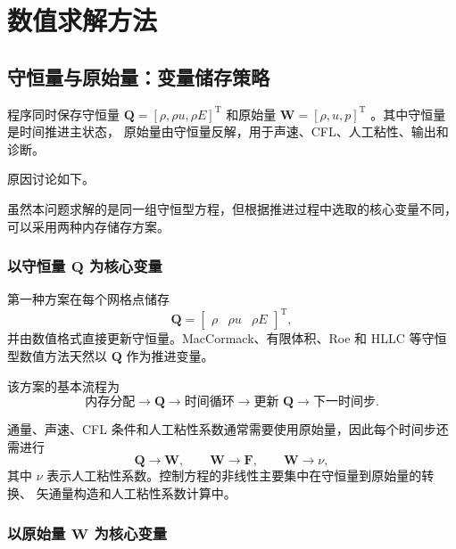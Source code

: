\section{数值求解方法}

\subsection{守恒量与原始量：变量储存策略}

程序同时保存守恒量
$\bm{Q}=[\rho,\rho u,\rho E]^{\mathrm T}$ 和原始量
$\bm{W}=[\rho,u,p]^{\mathrm T}$ 。其中守恒量是时间推进主状态，
原始量由守恒量反解，用于声速、CFL、人工粘性、输出和诊断。

原因讨论如下。

虽然本问题求解的是同一组守恒型方程，但根据推进过程中选取的核心变量不同，
可以采用两种内存储存方案。

\subsubsection{以守恒量 \texorpdfstring{$\bm{Q}$}{Q} 为核心变量}

第一种方案在每个网格点储存
\begin{equation}
\bm{Q}=
\begin{bmatrix}
\rho & \rho u & \rho E
\end{bmatrix}^{\mathrm T},
\end{equation}
并由数值格式直接更新守恒量。MacCormack、有限体积、Roe 和 HLLC
等守恒型数值方法天然以 $\bm{Q}$ 作为推进变量。

该方案的基本流程为
\begin{equation}
\text{内存分配}
\longrightarrow
\bm{Q}
\longrightarrow
\text{时间循环}
\longrightarrow
\text{更新 }\bm{Q}
\longrightarrow
\text{下一时间步}.
\end{equation}

通量、声速、CFL 条件和人工粘性系数通常需要使用原始量，因此每个时间步还需进行
\begin{equation}
\bm{Q}\longrightarrow\bm{W},
\qquad
\bm{W}\longrightarrow\bm{F},
\qquad
\bm{W}\longrightarrow\nu,
\end{equation}
其中 $\nu$ 表示人工粘性系数。控制方程的非线性主要集中在守恒量到原始量的转换、
矢通量构造和人工粘性系数计算中。

\subsubsection{以原始量 \texorpdfstring{$\bm{W}$}{W} 为核心变量}

